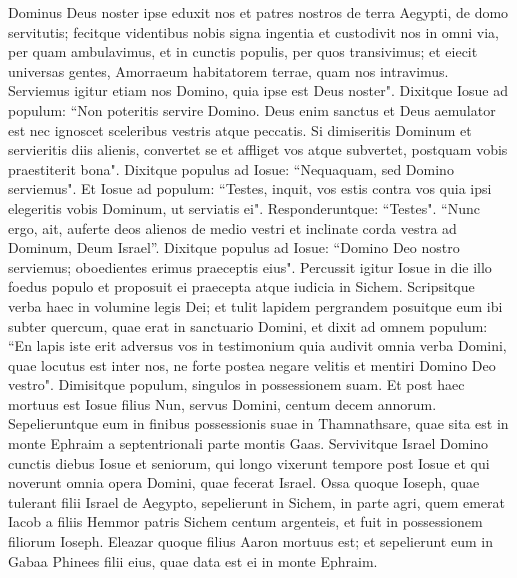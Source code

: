 \begin{biblechapter}
\verse Dominus Deus noster ipse eduxit nos et patres nostros de terra Aegypti, de domo servitutis; fecitque videntibus nobis signa ingentia et custodivit nos in omni via, per quam ambulavimus, et in cunctis populis, per quos transivimus; 
\verse et eiecit universas gentes, Amorraeum habitatorem terrae, quam nos intravimus. Serviemus igitur etiam nos Domino, quia ipse est Deus noster". 
\verse Dixitque Iosue ad populum: “Non poteritis servire Domino. Deus enim sanctus et Deus aemulator est nec ignoscet sceleribus vestris atque peccatis. 
\verse Si dimiseritis Dominum et servieritis diis alienis, convertet se et affliget vos atque subvertet, postquam vobis praestiterit bona". 
\verse Dixitque populus ad Iosue: “Nequaquam, sed Domino serviemus". 
\verse Et Iosue ad populum: “Testes, inquit, vos estis contra vos quia ipsi elegeritis vobis Dominum, ut serviatis ei". Responderuntque: “Testes". 
\verse “Nunc ergo, ait, auferte deos alienos de medio vestri et inclinate corda vestra ad Dominum, Deum Israel”.  
\verse Dixitque populus ad Iosue: “Domino Deo nostro serviemus; oboedientes erimus praeceptis eius". 
\verse Percussit igitur Iosue in die illo foedus populo et proposuit ei praecepta atque iudicia in Sichem. 
\verse Scripsitque verba haec in volumine legis Dei; et tulit lapidem pergrandem posuitque eum ibi subter quercum, quae erat in sanctuario Domini, 
\verse et dixit ad omnem populum: “En lapis iste erit adversus vos in testimonium quia audivit omnia verba Domini, quae locutus est inter nos, ne forte postea negare velitis et mentiri Domino Deo vestro". 
\verse Dimisitque populum, singulos in possessionem suam. 
\verse Et post haec mortuus est Iosue filius Nun, servus Domini, centum decem annorum. 
\verse Sepelieruntque eum in finibus possessionis suae in Thamnathsare, quae sita est in monte Ephraim a septentrionali parte montis Gaas. 
\verse Servivitque Israel Domino cunctis diebus Iosue et seniorum, qui longo vixerunt tempore post Iosue et qui noverunt omnia opera Domini, quae fecerat Israel. 
\verse Ossa quoque Ioseph, quae tulerant filii Israel de Aegypto, sepelierunt in Sichem, in parte agri, quem emerat Iacob a filiis Hemmor patris Sichem centum argenteis, et fuit in possessionem filiorum Ioseph. 
\verse Eleazar quoque filius Aaron mortuus est; et sepelierunt eum in Gabaa Phinees filii eius, quae data est ei in monte Ephraim.
\end{biblechapter}
